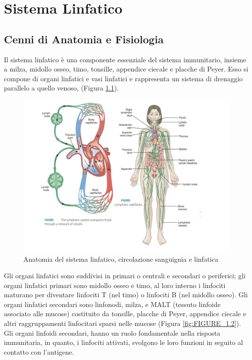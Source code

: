 \chapter{Sistema Linfatico}

\section{Cenni di Anatomia e Fisiologia}
Il sistema linfatico \`e una componente essenziale del sistema immunitario, 
insieme a milza, midollo osseo, timo, tonsille, appendice ciecale e placche di Peyer. 
Esso si compone di organi linfatici e vasi linfatici e rappresenta 
un sistema di drenaggio parallelo a quello venoso\cite{BOOK1}, (Figura \ref{fig:FIGURE_1.1}).

\begin{figure}[H]
    \begin{center}
    \includegraphics[width=0.9\columnwidth]{img/ANATOMY2.jpeg}
    \vspace{-3mm}
    \end{center}
    \caption{Anatomia del sistema linfatico, circolazione sanguignia e linfatica
    \cite{img1}}
    \label{fig:FIGURE_1.1}
\end{figure}


Gli organi linfatici sono suddivisi in primari o centrali 
e secondari o periferici; gli organi linfatici primari sono midollo osseo 
e timo, al loro interno i linfociti maturano per diventare linfociti T (nel timo) 
o linfociti B (nel midollo osseo). 
Gli organi linfatici secondari sono linfonodi, milza, e MALT 
(tessuto linfoide associato alle mucose) costituito da tonsille, 
placche di Peyer, appendice ciecale e altri raggruppamenti linfocitari 
sparsi nelle mucose (Figura \ref{fig:FIGURE_1.2}). Gli organi linfoidi secondari, hanno un ruolo fondamentale 
nella risposta immunitaria, in quanto, i linfociti attivati, svolgono le loro funzioni 
in seguito al contatto con l'antigene\cite{BOOK1}.

